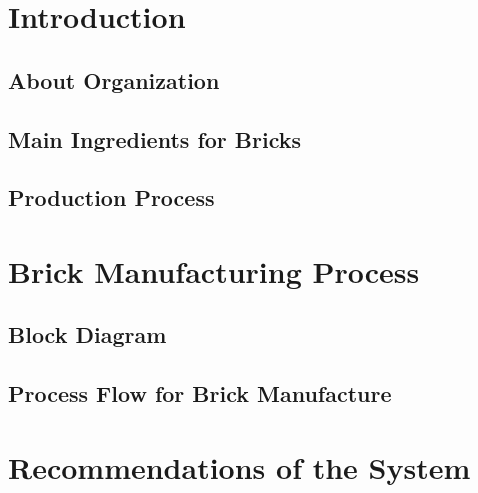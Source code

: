 \documentclass{article}
\begin{document}

\newpage




\newpage

\tableofcontents
{}

\newpage
{}

\section{Introduction}

\subsection{About Organization}

\subsection{Main Ingredients for Bricks}

\subsection{Production Process}

\section{Brick Manufacturing Process}

\subsection{Block Diagram}

\subsection{Process Flow for Brick Manufacture}

\section{Recommendations of the System}
\end{document}
